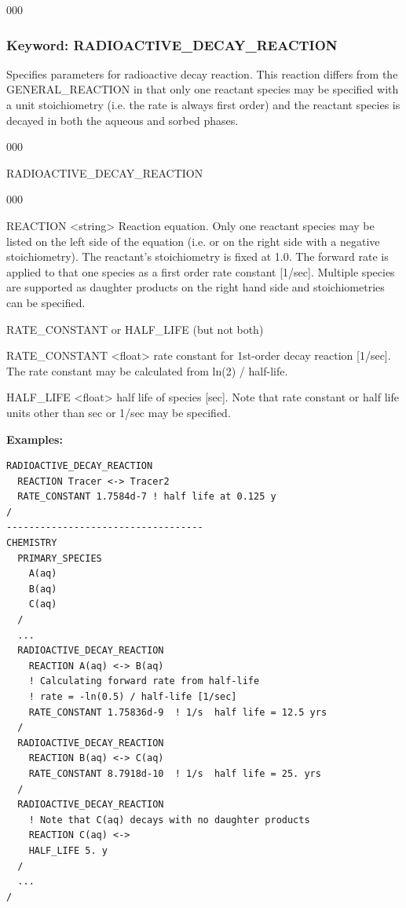 \begin{deflist}{000}
\clearpage
\protect\hypertarget{target_chem_rad}{}
\subsubsection{Keyword: RADIOACTIVE\_DECAY\_REACTION}

Specifies parameters for radioactive decay reaction. This reaction differs from the GENERAL\_REACTION in that only one reactant species may be specified with a unit stoichiometry (i.e. the rate is always first order) and the reactant species is decayed in both the aqueous and sorbed phases.

\hfill\hyperlink{target_key}{\return}

\begin{deflist}{000}
\item[RADIOACTIVE\_DECAY\_REACTION] ~
\begin{deflist}{000}

\item [REACTION] <string>
Reaction equation. Only one reactant species may be listed on the left side of the equation (i.e. or on the right side with a negative stoichiometry). The reactant's stoichiometry is fixed at 1.0. The forward rate is applied to that one species as a first order rate constant [1/sec]. Multiple species are supported as daughter products on the right hand side and stoichiometries can be specified.

\item [RATE\_CONSTANT or HALF\_LIFE] (but not both)

\item [RATE\_CONSTANT] <float>
rate constant for 1st-order decay reaction [1/sec]. The rate constant may be calculated from ln(2) / half-life.

\item [HALF\_LIFE] <float>
half life of species [sec].
Note that rate constant or half life units other than sec or 1/sec may be specified.
\end{deflist}

\item [\keyend]
\end{deflist}

\begin{mdframed}
{\bf Examples:}
\footnotesize
\begin{verbatim}
RADIOACTIVE_DECAY_REACTION
  REACTION Tracer <-> Tracer2
  RATE_CONSTANT 1.7584d-7 ! half life at 0.125 y
/
-----------------------------------
CHEMISTRY
  PRIMARY_SPECIES
    A(aq)
    B(aq)
    C(aq)
  /
  ...
  RADIOACTIVE_DECAY_REACTION
    REACTION A(aq) <-> B(aq)
    ! Calculating forward rate from half-life
    ! rate = -ln(0.5) / half-life [1/sec]
    RATE_CONSTANT 1.75836d-9  ! 1/s  half life = 12.5 yrs
  /
  RADIOACTIVE_DECAY_REACTION
    REACTION B(aq) <-> C(aq)
    RATE_CONSTANT 8.7918d-10  ! 1/s  half life = 25. yrs
  /
  RADIOACTIVE_DECAY_REACTION
    ! Note that C(aq) decays with no daughter products
    REACTION C(aq) <->
    HALF_LIFE 5. y
  /
  ...
/
\end{verbatim}
\normalsize
\end{mdframed}


\end{deflist}
